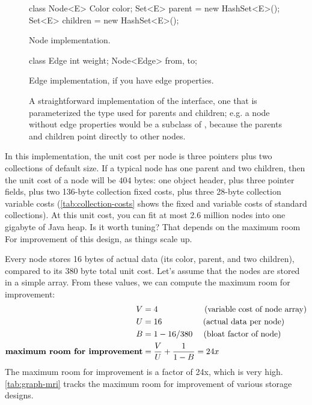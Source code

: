 \begin{figure}
\centering
\begin{subfloat}
\begin{minipage}[b]{0.59\textwidth}
\begin{framedlisting}
class Node<E> {
   Color color;
   Set<E> parent = new HashSet<E>();
   Set<E> children = new HashSet<E>();
}
\end{framedlisting}
\end{minipage}
\caption{Node implementation.}
\end{subfloat}
\begin{subfloat}
\begin{minipage}[b]{0.33\textwidth}
\begin{framedlisting}
class Edge {
   int weight;
   Node<Edge> from, to;
}
\end{framedlisting}
\end{minipage}
\caption{Edge implementation, if you have edge properties.}
\end{subfloat}
\caption{A straightforward implementation of the  interface,
one that is parameterized the type used for parents and
children; e.g. a node without edge properties would be a subclass of
, because the parents and children point directly to other
nodes.}
\label{fig:node-obvious-impl}
\end{figure}

In this implementation, the unit cost per node is three pointers plus two
collections of default size. If a typical node has one parent and two children,
then the unit cost of a node will be $404$ bytes: one object header, plus three
pointer fields, plus two 136-byte collection fixed costs, plus three 28-byte
collection variable costs (\autoref{tab:collection-costs} shows the fixed and
variable costs of standard collections). At this unit cost, you can fit at most
2.6 million nodes into one gigabyte of Java heap. Is it worth tuning? That
depends on the maximum room For improvement of this design, as things scale up.

Every node stores 16
bytes of actual data (its color, parent, and two children), compared to its 380
byte total unit cost. Let's assume that the nodes are stored in a simple array.
From these values, we can compute the maximum room for improvement:
\begin{align*}
V &= 4 ~~~~~~~~~~~~~~~~~\textrm{(variable cost of node array)}\\
U &= 16 ~~~~~~~~~~~~~~~\textrm{(actual data per node)}\\
B &= 1-16/380 ~~~~\textrm{(bloat factor of node)}\\
\textbf{\textrm{maximum room for improvement}} &= \frac{V}{U} + \frac{1}{1-B} =
24x
\end{align*}
The maximum room for improvement is a factor of 24x, which is very high.
\autoref{tab:graph-mri} tracks the maximum room for improvement of various
storage designs.

